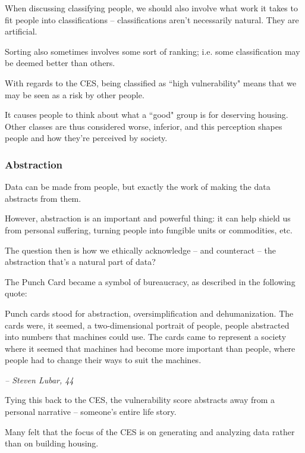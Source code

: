 \documentclass[openany]{book}
\begin{document}
When discussing classifying people, we should also involve what work it takes to fit people into classifications -- classifications aren't necessarily natural. They are artificial.

Sorting also sometimes involves some sort of ranking; i.e. some classification may be deemed better than others.

With regards to the CES, being classified as ``high vulnerability" means that we may be seen as a risk by other people.

It causes people to think about what a ``good" group is for deserving housing. Other classes are thus considered worse, inferior, and this perception shapes people and how they're perceived by society.

\subsubsection{Abstraction}
Data can be made from people, but exactly the work of making the data abstracts from them.

However, abstraction is an important and powerful thing: it can help shield us from personal suffering, turning people into fungible units or commodities, etc.

The question then is how we ethically acknowledge -- and counteract -- the abstraction that's a natural part of data?

\begin{example}
	The Punch Card became a symbol of bureaucracy, as described in the following quote:

\begin{fancyquotes}
	Punch cards stood for abstraction, oversimplification and dehumanization. The cards were, it seemed, a two-dimensional portrait of people, people abstracted into numbers that machines could use. The cards came to represent a society where it seemed that machines had become more important than people, where people had to change their ways to suit the machines.
	
	\begin{flushright}
		\emph{-- Steven Lubar, 44}
	\end{flushright}
\end{fancyquotes}
\end{example}

Tying this back to the CES, the vulnerability score abstracts away from a personal narrative -- someone's entire life story.

Many felt that the focus of the CES is on generating and analyzing data rather than on building housing.
\end{document}
